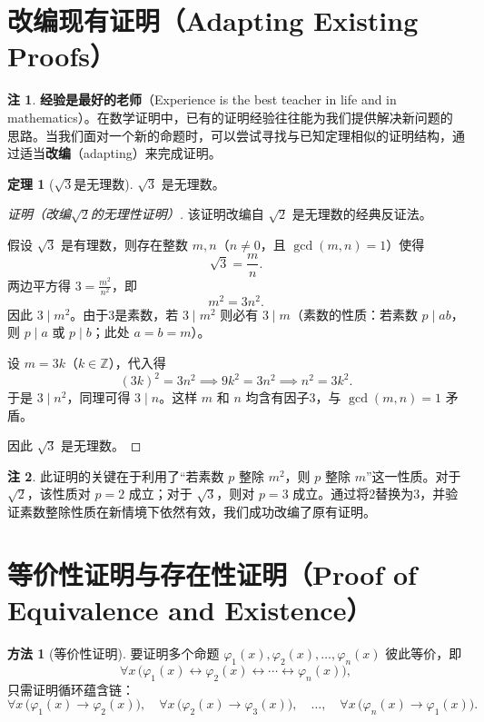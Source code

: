 \documentclass[UTF8,11pt,a4paper]{ctexbook}   %
\theoremstyle{definition}
\newtheorem{theorem}{定理}[section]
\newtheorem{remark}{注}[section]
\newtheorem{method}{方法}[section]
\begin{document}
\section{改编现有证明（Adapting Existing Proofs）}

\begin{remark}
\textbf{经验是最好的老师}（Experience is the best teacher in life and in mathematics）。在数学证明中，已有的证明经验往往能为我们提供解决新问题的思路。当我们面对一个新的命题时，可以尝试寻找与已知定理相似的证明结构，通过适当\textbf{改编}（adapting）来完成证明。
\end{remark}

\begin{theorem}[$\sqrt{3}$是无理数]
$\sqrt{3}$ 是无理数。
\end{theorem}

\begin{proof}[证明（改编$\sqrt{2}$的无理性证明）]
该证明改编自 $\sqrt{2}$ 是无理数的经典反证法。

假设 $\sqrt{3}$ 是有理数，则存在整数 $m,n$（$n \neq 0$，且 $\gcd(m,n)=1$）使得
\[
\sqrt{3} = \frac{m}{n}.
\]
两边平方得 $3 = \frac{m^2}{n^2}$，即
\[
m^2 = 3n^2.
\]
因此 $3 \mid m^2$。由于3是素数，若 $3 \mid m^2$ 则必有 $3 \mid m$（素数的性质：若素数 $p \mid ab$，则 $p \mid a$ 或 $p \mid b$；此处 $a=b=m$）。

设 $m = 3k$（$k \in \mathbb{Z}$），代入得
\[
(3k)^2 = 3n^2 \implies 9k^2 = 3n^2 \implies n^2 = 3k^2.
\]
于是 $3 \mid n^2$，同理可得 $3 \mid n$。这样 $m$ 和 $n$ 均含有因子3，与 $\gcd(m,n)=1$ 矛盾。

因此 $\sqrt{3}$ 是无理数。
\end{proof}

\begin{remark}
此证明的关键在于利用了``若素数 $p$ 整除 $m^2$，则 $p$ 整除 $m$''这一性质。对于 $\sqrt{2}$，该性质对 $p=2$ 成立；对于 $\sqrt{3}$，则对 $p=3$ 成立。通过将2替换为3，并验证素数整除性质在新情境下依然有效，我们成功改编了原有证明。
\end{remark}

\section{等价性证明与存在性证明（Proof of Equivalence and Existence）}

\begin{method}[等价性证明]
要证明多个命题 $\varphi_1(x),\varphi_2(x),\dots,\varphi_n(x)$ 彼此等价，即
\[
\forall x\,\bigl(\varphi_1(x)\leftrightarrow\varphi_2(x)\leftrightarrow\cdots\leftrightarrow\varphi_n(x)\bigr),
\]
只需证明循环蕴含链：
\[
\forall x\,\bigl(\varphi_1(x)\to\varphi_2(x)\bigr),\quad
\forall x\,\bigl(\varphi_2(x)\to\varphi_3(x)\bigr),\quad\dots,\quad
\forall x\,\bigl(\varphi_n(x)\to\varphi_1(x)\bigr).
\]
\end{method}
\end{document}
